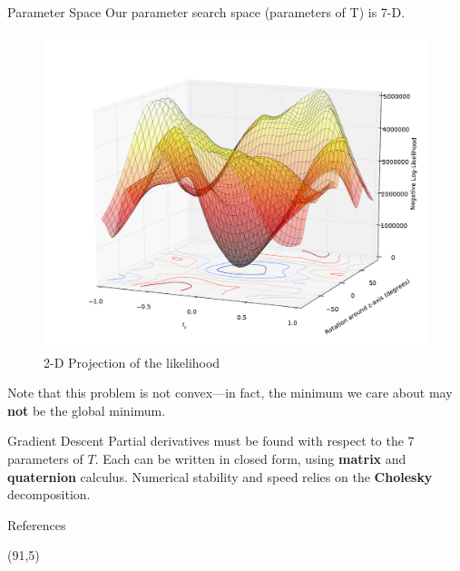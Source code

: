 \documentclass[final]{beamer}
\begin{document}
\begin{frame}{}
\begin{textblock}{27}
\begin{block}{Parameter Space}
Our parameter search space (parameters of T) is 7-D.
\begin{figure}
\includegraphics[width=10in]{LLmap3.pdf}
\caption{2-D Projection of the likelihood}
\end{figure}
Note that this problem is not convex---in fact, the minimum we care about may {\bf not} be the global minimum. 
\end{block}

\begin{block}{Gradient Descent}
Partial derivatives must be found with respect to the 7 parameters of $T$. Each can be written in closed form,
using {\bf matrix} and {\bf quaternion} calculus. Numerical stability and speed relies on the {\bf Cholesky} decomposition.
\end{block}


\begin{block}{References}
{
\footnotesize


}
\end{block}


\end{textblock}
\begin{textblock}{27}(91,5)


\end{textblock}
\end{frame}
\end{document}
